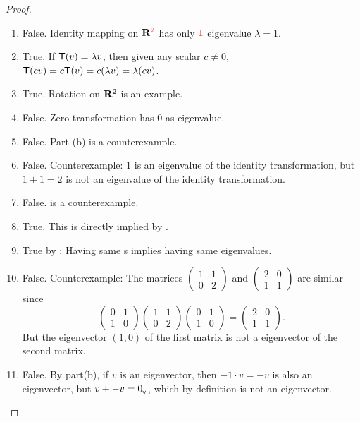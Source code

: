 \begin{proof} \ 

\begin{enumerate}
\item False. Identity mapping on \(\SET{R}^{\RED{2}}\) has only \(\RED{1}\) eigenvalue \(\lambda = 1\).
\item True. If \(\textsf{T}(v) = \lambda v\), then given any scalar \(c \ne 0\), \(\textsf{T}(cv) = c \textsf{T}(v) = c (\lambda v) = \lambda (c v)\).
\item True. Rotation on \(\mathbf{R}^2\) is an example.
\item False. Zero transformation has \(0\) as eigenvalue.
\item False. Part (b) is a counterexample.
\item False. Counterexample: \(1\) is an eigenvalue of the identity transformation, but \(1 + 1 = 2\) is not an eigenvalue of the identity transformation.
\item False.  is a counterexample.
\item True. This is directly implied by .
\item True by : Having same \CPOLY{}s implies having same eigenvalues.
\item False. Counterexample:
    The matrices \(\left(\begin{array}{ll}1 & 1 \\ 0 & 2\end{array}\right)\) and \(\left(\begin{array}{ll}2 & 0 \\ 1 & 1\end{array}\right)\)  are similar since
    \[
        \left(\begin{array}{ll} 0 & 1 \\ 1 & 0 \end{array}\right)
        \left(\begin{array}{ll} 1 & 1 \\ 0 & 2 \end{array}\right)
        \left(\begin{array}{ll} 0 & 1 \\ 1 & 0 \end{array}\right)
        = \left(\begin{array}{ll} 2 & 0 \\ 1 & 1 \end{array}\right).
    \]
    But the eigenvector \((1,0)\) of the first matrix is not a eigenvector of the second matrix.

\item False. By part(b), if \(v\) is an eigenvector, then \(-1 \cdot v = -v\) is also an eigenvector, but \(v + -v = 0_{_{\textsf{V}}}\), which by definition is not an eigenvector.
\end{enumerate}
\end{proof}

